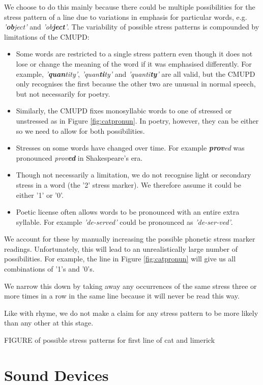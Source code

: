 We choose to do this mainly because there could be multiple possibilities for the stress pattern of a line due to variations in emphasis for particular words, e.g. \textit{'\textbf{ob}ject'} and \textit{'ob\textbf{ject}'}. The variability of possible stress patterns is compounded by limitations of the CMUPD:
\begin{itemize}
\item{Some words are restricted to a single stress pattern even though it does not lose or change the meaning of the word if it was emphasised differently. For example, \textit{'\textbf{quan}tity'}, \textit{'quan\textbf{ti}ty'} and \textit{'quanti\textbf{ty}'} are all valid, but the CMUPD only recognises the first because the other two are unusual in normal speech, but not necessarily for poetry.}
\item{Similarly, the CMUPD fixes monosyllabic words to one of stressed or unstressed as in Figure \ref{fig:catpronun}. In poetry, however, they can be either so we need to allow for both possibilities.}
\item{Stresses on some words have changed over time. For example \textit{\textbf{prov}ed} was pronounced \textit{prov\textbf{ed}} in Shakespeare's era.}
\item{Though not necessarily a limitation, we do not recognise light or secondary stress in a word (the '2' stress marker). We therefore assume it could be either '1' or '0'.}
\item{Poetic license often allows words to be pronounced with an entire extra syllable. For example \textit{'de-served'} could be pronounced as \textit{'de-ser-ved'}.}
\end{itemize}

We account for these by manually increasing the possible phonetic stress marker readings. Unfortunately, this will lead to an unrealistically large number of possibilities. For example, the line in Figure \ref{fig:catpronun} will give us all combinations of '1's and '0's. 

We narrow this down by taking away any occurrences of the same stress three or more times in a row in the same line because it will never be read this way.  

Like with rhyme, we do not make a claim for any stress pattern to be more likely than any other at this stage.

FIGURE of possible stress patterns for first line of cat and limerick


\section{Sound Devices}

